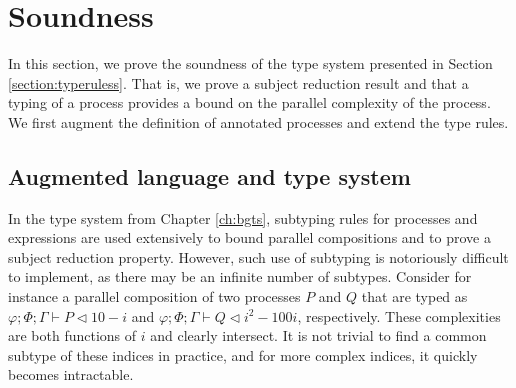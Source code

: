\section{Soundness}\label{sec:tcsoundness}
In this section, we prove the soundness of the type system presented in Section \ref{section:typeruless}. That is, we prove a subject reduction result and that a typing of a process provides a bound on the parallel complexity of the process. We first augment the definition of annotated processes and extend the type rules.
%
\subsection{Augmented language and type system}
In the type system from Chapter \ref{ch:bgts}, subtyping rules for processes and expressions are used extensively to bound parallel compositions and to prove a subject reduction property. However, such use of subtyping is notoriously difficult to implement, as there may be an infinite number of subtypes. Consider for instance a parallel composition of two processes $P$ and $Q$ that are typed as $\varphi;\Phi;\Gamma\vdash P \triangleleft 10 - i$ and $\varphi;\Phi;\Gamma\vdash Q \triangleleft i^2 - 100i$, respectively. These complexities are both functions of $i$ and clearly intersect. It is not trivial to find a common subtype of these indices in practice, and for more complex indices, it quickly becomes intractable.\\

